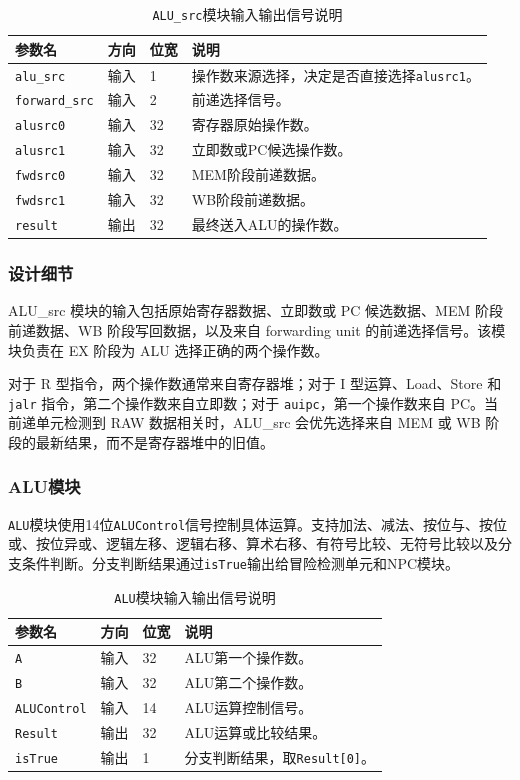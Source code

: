 \documentclass[12pt,a4paper]{ctexart}
\newcommand{\code}[1]{\texttt{#1}}
\begin{document}
\begin{table}[H]
\centering
\caption{\code{ALU\_src}模块输入输出信号说明}
\footnotesize
\renewcommand{\arraystretch}{1.15}
\begin{tabularx}{\textwidth}{p{3.2cm}p{1.5cm}p{2.1cm}X}
\toprule
参数名 & 方向 & 位宽 & 说明 \\
\midrule
\code{alu\_src} & 输入 & 1 & 操作数来源选择，决定是否直接选择\code{alusrc1}。 \\
\code{forward\_src} & 输入 & 2 & 前递选择信号。 \\
\code{alusrc0} & 输入 & 32 & 寄存器原始操作数。 \\
\code{alusrc1} & 输入 & 32 & 立即数或PC候选操作数。 \\
\code{fwdsrc0} & 输入 & 32 & MEM阶段前递数据。 \\
\code{fwdsrc1} & 输入 & 32 & WB阶段前递数据。 \\
\code{result} & 输出 & 32 & 最终送入ALU的操作数。 \\
\bottomrule
\end{tabularx}
\end{table}

\subsubsection*{设计细节}

ALU\_src 模块的输入包括原始寄存器数据、立即数或 PC 候选数据、MEM 阶段前递数据、WB 阶段写回数据，以及来自 forwarding unit 的前递选择信号。该模块负责在 EX 阶段为 ALU 选择正确的两个操作数。

对于 R 型指令，两个操作数通常来自寄存器堆；对于 I 型运算、Load、Store 和 \code{jalr} 指令，第二个操作数来自立即数；对于 \code{auipc}，第一个操作数来自 PC。当前递单元检测到 RAW 数据相关时，ALU\_src 会优先选择来自 MEM 或 WB 阶段的最新结果，而不是寄存器堆中的旧值。

\subsubsection{ALU模块}

\code{ALU}模块使用14位\code{ALUControl}信号控制具体运算。支持加法、减法、按位与、按位或、按位异或、逻辑左移、逻辑右移、算术右移、有符号比较、无符号比较以及分支条件判断。分支判断结果通过\code{isTrue}输出给冒险检测单元和NPC模块。

\begin{table}[H]
\centering
\caption{\code{ALU}模块输入输出信号说明}
\footnotesize
\renewcommand{\arraystretch}{1.15}
\begin{tabularx}{\textwidth}{p{3.2cm}p{1.5cm}p{2.1cm}X}
\toprule
参数名 & 方向 & 位宽 & 说明 \\
\midrule
\code{A} & 输入 & 32 & ALU第一个操作数。 \\
\code{B} & 输入 & 32 & ALU第二个操作数。 \\
\code{ALUControl} & 输入 & 14 & ALU运算控制信号。 \\
\code{Result} & 输出 & 32 & ALU运算或比较结果。 \\
\code{isTrue} & 输出 & 1 & 分支判断结果，取\code{Result[0]}。 \\
\bottomrule
\end{tabularx}
\end{table}
\end{document}
